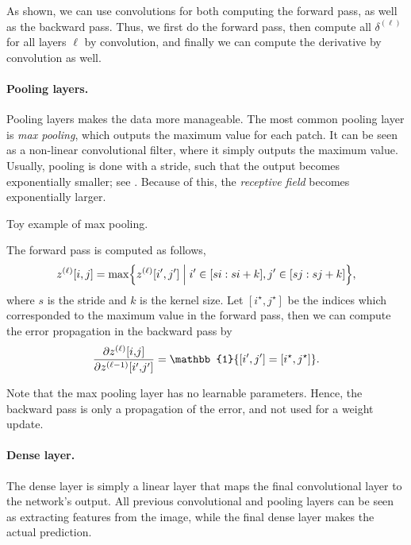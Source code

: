 As shown, we can use convolutions for both computing the forward pass, as well as the backward
pass. Thus, we first do the forward pass, then compute all $\delta^{(\ell)}$ for all layers $\ell$
by convolution, and finally we can compute the derivative by convolution as well.

\paragraph{Pooling layers.}

Pooling layers makes the data more manageable. The most common pooling layer is \textit{max
    pooling}, which outputs the maximum value for each patch. It can be seen as a non-linear
convolutional filter, where it simply outputs the maximum value. Usually, pooling is done with a
stride, such that the output becomes exponentially smaller; see . Because of
this, the \textit{receptive field} becomes exponentially larger.

\begin{marginfigure}
    \centering
    \caption{Toy example of max pooling.}
    \label{fig:max-pooling}
\end{marginfigure}

The forward pass is computed as follows,
\[
    z^{(\ell)}[i,j] = \max \lft\{ z^{(\ell)}[i',j'] \;\middle|\; i' \in [si:si+k], j' \in [sj:sj+k] \rgt\},
\]
where $s$ is the stride and $k$ is the kernel size. Let $[i^\star,j^\star]$ be the indices which
corresponded to the maximum value in the forward pass, then we can compute the error propagation in
the backward pass by \[
    \pdv{z^{(\ell)}[i{,}j]}{z^{(\ell-1)}[i'{,}j']} = \mathbb{1}\{ [i',j'] = [i^\star,j^\star] \}.
\]

Note that the max pooling layer has no learnable parameters. Hence, the backward pass is only a
propagation of the error, and not used for a weight update.

\paragraph{Dense layer.}

The dense layer is simply a linear layer that maps the final convolutional layer to the network's
output. All previous convolutional and pooling layers can be seen as extracting features from the
image, while the final dense layer makes the actual prediction.
